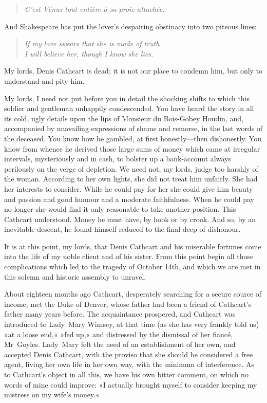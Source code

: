 \begin{dialogue}
\begin{quote}\itshape C'est Vénus tout entière à sa proie attachée.\end{quote}

And Shakespeare has put the lover's despairing obstinacy into two piteous lines:

\begin{quote}\itshape
If my love swears that she is made of truth\\
I will believe her, though I know she lies.\\
\end{quote}

My lords, Denis Cathcart is dead; it is not our place to condemn him, but only to understand and pity him.

My lords, I need not put before you in detail the shocking shifts to which this soldier and gentleman unhappily condescended. You have heard the story in all its cold, ugly details upon the lips of Monsieur du Bois-Gobey Houdin, and, accompanied by unavailing expressions of shame and remorse, in the last words of the deceased. You know how he gambled, at first honestly—then dishonestly. You know from whence he derived those large sums of money which came at irregular intervals, mysteriously and in cash, to bolster up a bank-account always perilously on the verge of depletion. We need not, my lords, judge too harshly of the woman. According to her own lights, she did not treat him unfairly. She had her interests to consider. While he could pay for her she could give him beauty and passion and good humour and a moderate faithfulness. When he could pay no longer she would find it only reasonable to take another position. This Cathcart understood. Money he must have, by hook or by crook. And so, by an inevitable descent, he found himself reduced to the final deep of dishonour.

\smallskip 

It is at this point, my lords, that Denis Cathcart and his miserable fortunes come into the life of my noble client and of his sister. From this point begin all those complications which led to the tragedy of October 14th, and which we are met in this solemn and historic assembly to unravel.

\smallskip 

About eighteen months ago Cathcart, desperately searching for a secure source of income, met the Duke of Denver, whose father had been a friend of Cathcart's father many years before. The acquaintance prospered, and Cathcart was introduced to Lady~Mary Wimsey, at that time (as she has very frankly told us) »at a loose end,« »fed up,« and distressed by the dismissal of her fiancé, Mr~Goyles. Lady~Mary felt the need of an establishment of her own, and accepted Denis Cathcart, with the proviso that she should be considered a free agent, living her own life in her own way, with the minimum of interference. As to Cathcart's object in all this, we have his own bitter comment, on which no words of mine could improve: »I actually brought myself to consider keeping my mistress on my wife's money.«


\end{dialogue}

